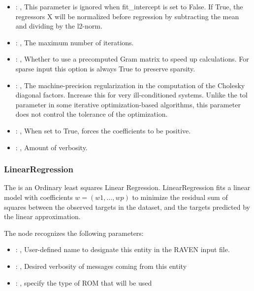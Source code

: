 \begin{itemize}
    \item {}: , 
      This parameter is ignored when fit\_intercept is set to False. If True,
      the regressors X will be normalized before regression by subtracting the mean and
      dividing by the l2-norm.

    \item {}: , 
      The maximum number of iterations.

    \item {}: , 
      Whether to use a precomputed Gram matrix to speed up calculations.
      For sparse input this option is always True to preserve sparsity.

    \item {}: , 
      The machine-precision regularization in the computation of the Cholesky
      diagonal factors. Increase this for very ill-conditioned systems. Unlike the tol
      parameter in some iterative optimization-based algorithms, this parameter does not
      control the tolerance of the optimization.

    \item {}: , 
      When set to True, forces the coefficients to be positive.

    \item {}: , 
      Amount of verbosity.
  \end{itemize}


\subsubsection{LinearRegression}
  The                          is an Ordinary least squares Linear
  Regression.                         LinearRegression fits a linear model with coefficients $w =
  (w1, …, wp)$ to                         minimize the residual sum of squares between the observed
  targets in the                         dataset, and the targets predicted by the linear
  approximation.                         

  The  node recognizes the following parameters:
    \begin{itemize}
      \item {}: , 
        User-defined name to designate this entity in the RAVEN input file.
      \item {}: , 
        Desired verbosity of messages coming from this entity
      \item {}: , 
        specify the type of ROM that will be used
  \end{itemize}

